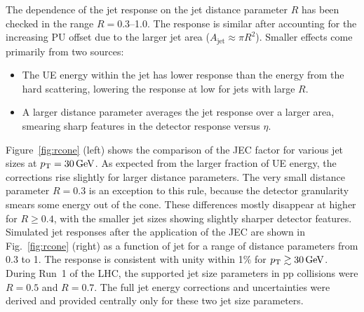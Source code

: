 \documentclass[11pt,twoside,a4paper,cmspaper,final,collab]{cms-tdr}
\begin{document}
The dependence of the jet response on the jet distance parameter $R$ has been checked in the range $R=0.3$--1.0.
The response is similar after accounting for the increasing PU offset due to the larger jet area ($A_\text{jet}\approx\pi R^2$). Smaller effects come primarily from two sources:
\begin{itemize}
\item The UE energy within the jet has lower response than the energy from the hard scattering, lowering the response at low \pt for jets with large $R$.
\item A larger distance parameter averages the jet response over a larger area, smearing sharp features in the detector response versus $\eta$.
\end{itemize}
Figure~\ref{fig:rcone} (left) shows the comparison of the JEC factor for various jet sizes at $p_{\mathrm{T}}=30\,\text{Ge\hspace{-.08em}V}$. As expected from the larger fraction of UE energy, the corrections rise slightly for larger distance parameters. The very small distance parameter $R=0.3$ is an exception to this rule, because the detector granularity smears some energy out of the cone.
These differences mostly disappear at higher \pt for $R\geq 0.4$, with the smaller jet sizes showing slightly sharper detector features. Simulated jet responses after the application of the JEC are shown in Fig.~\ref{fig:rcone} (right) as a function of jet \pt for a range of distance parameters from 0.3 to 1. The response is consistent with unity within 1$\%$ for $p_{\mathrm{T}}\gtrsim 30\,\text{Ge\hspace{-.08em}V}$.
During Run~1 of the LHC, the supported jet size parameters in pp collisions were $R=0.5$ and $R=0.7$. The full jet energy corrections and uncertainties were derived and provided centrally only for these two jet size parameters.
\end{document}
